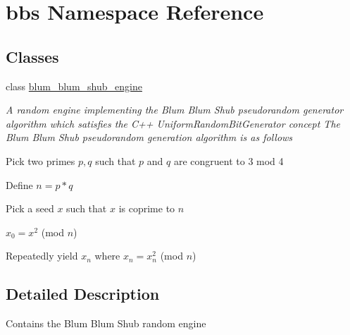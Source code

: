 \hypertarget{namespacebbs}{}\section{bbs Namespace Reference}
\label{namespacebbs}
\subsection*{Classes}
\begin{DoxyCompactItemize}
\item 
class \hyperlink{classbbs_1_1blum__blum__shub__engine}{blum\+\_\+blum\+\_\+shub\+\_\+engine}
\begin{DoxyCompactList}\small\item\em A random engine implementing the Blum Blum Shub pseudorandom generator algorithm which satisfies the C++ Uniform\+Random\+Bit\+Generator concept The Blum Blum Shub pseudorandom generation algorithm is as follows
\begin{DoxyEnumerate}
\item Pick two primes $ p, q $ such that $ p $ and $ q $ are congruent to 3 mod 4
\item Define $ n = p * q $
\item Pick a seed $ x $ such that $ x $ is coprime to $ n $
\item $ x_0 = x^2$ (mod $ n $)
\item Repeatedly yield $ x_n $ where $ x_n = x_n^2 $ (mod $ n $) 
\end{DoxyEnumerate}\end{DoxyCompactList}\end{DoxyCompactItemize}


\subsection{Detailed Description}
Contains the Blum Blum Shub random engine 